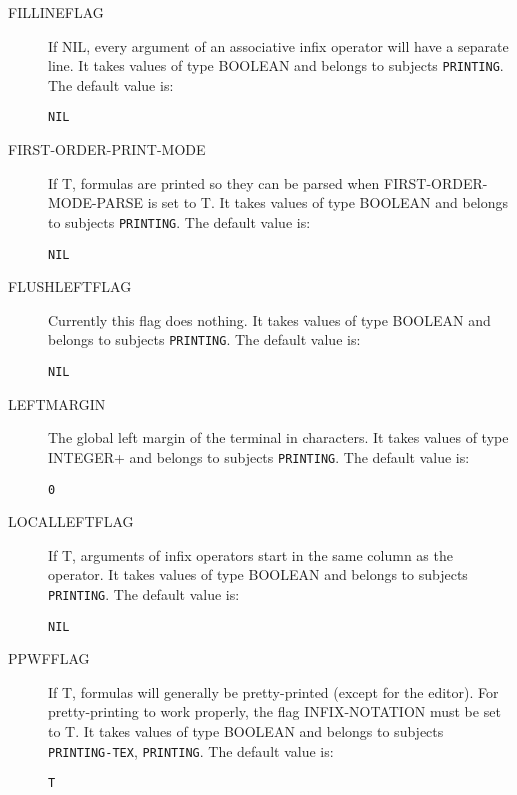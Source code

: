 \begin{description}
\item[FILLINEFLAG]  
If NIL, every argument of an associative infix operator will have a
separate line.
It takes values of type BOOLEAN and belongs to subjects \texttt{PRINTING}.  The default value is: \begin{lstlisting}
NIL
\end{lstlisting}

\item[FIRST-ORDER-PRINT-MODE]  
If T, formulas are printed so they can be parsed when 
FIRST-ORDER-MODE-PARSE is set to T.
It takes values of type BOOLEAN and belongs to subjects \texttt{PRINTING}.  The default value is: \begin{lstlisting}
NIL
\end{lstlisting}

\item[FLUSHLEFTFLAG]  
Currently this flag does nothing.
It takes values of type BOOLEAN and belongs to subjects \texttt{PRINTING}.  The default value is: \begin{lstlisting}
NIL
\end{lstlisting}

\item[LEFTMARGIN]  
The global left margin of the terminal in characters.
It takes values of type INTEGER+ and belongs to subjects \texttt{PRINTING}.  The default value is: \begin{lstlisting}
0
\end{lstlisting}

\item[LOCALLEFTFLAG]  
If T, arguments of infix operators start in the same column as
the operator.
It takes values of type BOOLEAN and belongs to subjects \texttt{PRINTING}.  The default value is: \begin{lstlisting}
NIL
\end{lstlisting}

\item[PPWFFLAG]  
If T, formulas will generally be pretty-printed
(except for the editor).  For pretty-printing to work properly,
the flag INFIX-NOTATION must be set to T.
It takes values of type BOOLEAN and belongs to subjects \texttt{PRINTING-TEX}, \texttt{PRINTING}.  The default value is: \begin{lstlisting}
T
\end{lstlisting}


\end{description}
